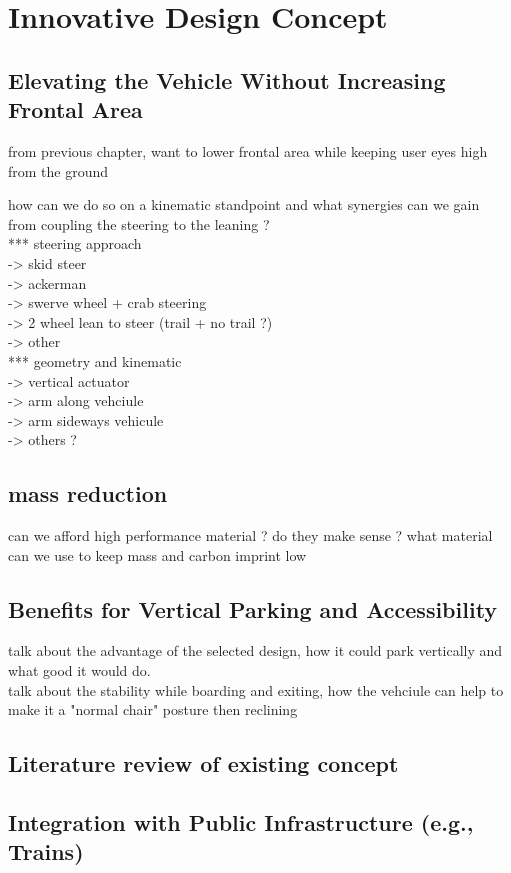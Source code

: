 \section{Innovative Design Concept}

\subsection{Elevating the Vehicle Without Increasing Frontal Area}

from previous chapter, want to lower frontal area while keeping user eyes high from the ground

how can we do so on a kinematic standpoint and what synergies can we gain from coupling the steering to the leaning ?\\

*** steering approach\\
-> skid steer\\
-> ackerman\\
-> swerve wheel + crab steering\\
-> 2 wheel lean to steer (trail + no trail ?)\\
-> other\\
*** geometry and kinematic\\
-> vertical actuator\\
-> arm along vehciule\\
-> arm sideways vehicule\\
-> others ?\\

\subsection{mass reduction}
can we afford high performance material ? do they make sense ? what material can we use to keep mass and carbon imprint low

\subsection{Benefits for Vertical Parking and Accessibility}
talk about the advantage of the selected design, how it could park vertically and what good it would do.\\

talk about the stability while boarding and exiting, how the vehciule can help to make it a "normal chair" posture then reclining\\

\subsection{Literature review of existing concept}

\subsection{Integration with Public Infrastructure (e.g., Trains)}